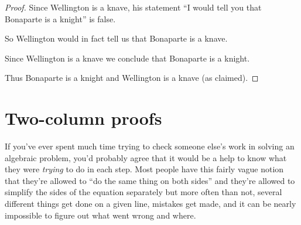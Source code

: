 \documentclass[10pt,]{book}
\theoremstyle{plain}
\theoremstyle{definition}
\theoremstyle{definition}
\numberwithin{equation}{section}
\begin{document}
\begin{enumerate}[label=(\alph*)]
\begin{enumerate}[label=\roman*.]
{\begin{proof}
            Since Wellington is a knave, his statement ``I would tell you that Bonaparte is a knight'' is false.
\par

\par

            So Wellington would in fact tell us that Bonaparte is a knave.
\par

\par

            Since Wellington is a knave we conclude that Bonaparte is a knight.
\par

\par

            Thus Bonaparte is a knight and Wellington is a knave (as claimed).
\par

\end{proof}


        }
\end{enumerate}

\end{enumerate}
\typeout{************************************************}
\typeout{************************************************}
\section[{Two-column proofs}]{Two-column proofs}\label{sec_2_col}

    If you've ever spent much time trying to check someone else's work
    in solving an algebraic problem, you'd probably agree that it
    would be a help to know what they were \emph{trying} to do in each
    step. Most people have this fairly vague notion that they're allowed
    to ``do the same thing on both sides'' and they're allowed to simplify
    the sides of the equation separately \textemdash{} but more often than not, several
    different things get done on a given line, mistakes get made, and it can
    be nearly impossible to figure out what went wrong and where.
\par
\end{document}
